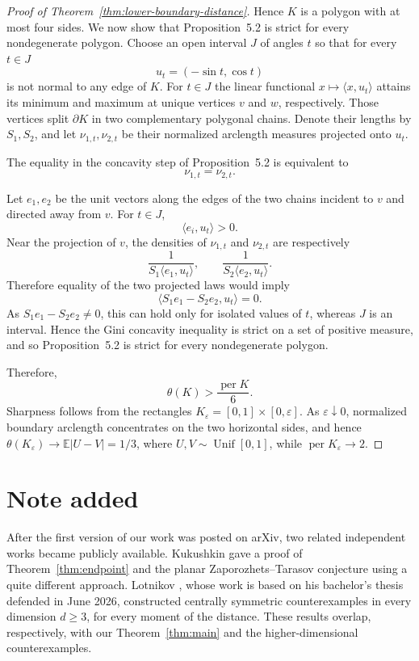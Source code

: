 \documentclass[final,12pt]{elsarticle}
\numberwithin{equation}{section}
\theoremstyle{remark}
\theoremstyle{definition}
\begin{document}
\begin{proof}[Proof of Theorem~\ref{thm:lower-boundary-distance}]
Hence $K$ is a polygon with at most four sides. We now show that
Proposition~5.2 is strict for every nondegenerate polygon. Choose an
open interval $J$ of angles $t$ so that for every $t\in J$
$$u_t = (-\sin t, \cos t)$$
is not normal to any edge of $K$.
For $t\in J$ the linear functional $x\mapsto\langle x, u_t \rangle$ attains its minimum and maximum at unique vertices $v$ and $w$, respectively. Those vertices split $\partial K$ in two complementary polygonal chains. Denote their lengths by $S_1,S_2$, and let $\nu_{1,t},\nu_{2,t}$ be their normalized arclength measures projected onto $u_t$.

The equality in the concavity step of
Proposition~5.2 is equivalent to
\[
    \nu_{1,t}=\nu_{2,t}.
\]

Let $e_1,e_2$ be the unit vectors along the edges of
the two chains incident to $v$ and directed away from $v$. For $t\in J$,
\[
    \langle e_i,u_t\rangle>0.
\]
Near the projection of $v$, the densities of
$\nu_{1,t}$ and $\nu_{2,t}$ are respectively
\[
    \frac{1}{S_1\langle e_1,u_t\rangle},
    \qquad
    \frac{1}{S_2\langle e_2,u_t\rangle}.
\]
Therefore equality of the two projected laws would imply
\[
    \bigl\langle S_1e_1-S_2e_2,u_t\bigr\rangle=0.
\]
As $S_1e_1-S_2e_2\ne0$, this can hold only for isolated values of $t$, whereas $J$ is an interval. Hence the Gini
concavity inequality is strict on a set of positive measure, and so
Proposition~5.2 is strict for every nondegenerate polygon.

Therefore,
\[
    \theta(K)>\frac{\operatorname{per}K}{6}.
\]
Sharpness follows from the rectangles
$K_\varepsilon=[0,1]\times[0,\varepsilon]$.
As $\varepsilon\downarrow0$, normalized boundary arclength concentrates
on the two horizontal sides, and hence
$\theta(K_\varepsilon)\to\mathbb E|U-V|=1/3$, where
$U,V\sim\operatorname{Unif}[0,1]$, while
$\operatorname{per}K_\varepsilon\to2$.
\end{proof}


\section{Note added}
 After the first version of our work was posted on arXiv, two related independent works became publicly available. Kukushkin \cite{Kukushkin_mach} gave a proof of Theorem~\ref{thm:endpoint} and the planar Zaporozhets--Tarasov conjecture using a quite different approach. Lotnikov \cite{Lotnikov_thes}, whose work is based on his bachelor's thesis defended in June 2026, constructed centrally symmetric counterexamples in every dimension $d\ge3$, for every moment of the distance. These results overlap, respectively, with our Theorem~\ref{thm:main} and the higher-dimensional counterexamples.
\end{document}
